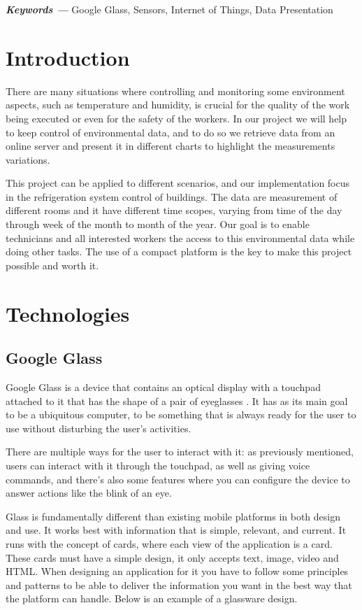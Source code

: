 \documentclass[a4paper,11pt]{article}
\providecommand{\keywords}[1]{\textbf{\textit{Keywords ---}} #1}
\begin{document}
\keywords{ Google Glass, Sensors, Internet of Things, Data  Presentation }

\medskip

\section{Introduction}

There are many situations where controlling and monitoring some environment aspects, such as temperature and humidity, is crucial for the quality of the work being executed or even for the safety of the workers. In our project we will help to keep control of environmental data, and to do so we retrieve data from an online server and present it in different charts to highlight the measurements variations.

This project can be applied to different scenarios, and our implementation focus in the refrigeration system control of buildings. The data are measurement of different rooms and it have different time scopes, varying from time of the day through week of the month to month of the year. Our goal is to enable technicians and all interested workers the access to this environmental data while doing other tasks. The use of a compact platform is the key to make this project possible and worth it.

\section{Technologies}

\subsection{Google Glass}

Google Glass is a device that contains an optical display with a touchpad attached to it that has the shape of a pair of eyeglasses \cite{glassdevelopers,tecmundoandroid}. It has as its main goal to be a ubiquitous computer, to be something that is always ready for the user to use without disturbing the user’s activities. 

There are multiple ways for the user to interact with it: as previously mentioned, users can interact with it through the touchpad, as well as giving voice commands, and there’s also some features where you can configure the device to answer actions like the blink of an eye.

Glass is fundamentally different than existing mobile platforms in both design and use. It works best with information that is simple, relevant, and current. It runs with the concept of cards, where each view of the application is a card. These cards must have a simple design, it only accepts text, image, video and HTML. When designing an application for it you have to follow some principles and patterns to be able to deliver the information you want in the best way that the platform can handle. Below is an example of a glassware design.
\end{document}
